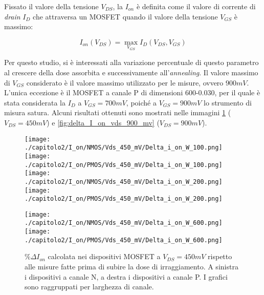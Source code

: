 Fissato il valore della tensione $V_{DS}$, la $I_{on}$ è definita come il valore di corrente di \emph{drain} $I_D$ che attraversa un MOSFET quando il valore della tensione $V_{GS}$ è massimo:

\begin{equation}
    I_{on}(V_{DS}) = \max_{V_{GS}} I_D(V_{DS},V_{GS})
\end{equation}

Per questo studio, si è interessati alla variazione percentuale di questo parametro al crescere della dose assorbita e successivamente all'\emph{annealing}. Il valore massimo di $V_{GS}$ considerato è il valore massimo utilizzato per le misure, ovvero $900 mV$. L'unica eccezione è il MOSFET a canale P di dimensioni 600-0.030, per il quale è stata considerata la $I_D$ a $V_{GS} = 700 mV$, poiché a $V_{GS} = 900mV$ lo strumento di misura satura. Alcuni risultati ottenuti sono mostrati nelle immagini \ref{fig:delta_I_on_vds_450_mv} ($V_{DS} = 450 mV$) e \ref{fig:delta_I_on_vds_900_mv} ($V_{DS} = 900 mV$).

\begin{figure}[h]
    \centering
    \texttt{[image: ./capitolo2/I\_on/NMOS/Vds\_450\_mV/Delta\_i\_on\_W\_100.png]}
    \texttt{[image: ./capitolo2/I\_on/PMOS/Vds\_450\_mV/Delta\_i\_on\_W\_100.png]}\\
    \vspace{0.2cm}
    \texttt{[image: ./capitolo2/I\_on/NMOS/Vds\_450\_mV/Delta\_i\_on\_W\_200.png]}
    \texttt{[image: ./capitolo2/I\_on/PMOS/Vds\_450\_mV/Delta\_i\_on\_W\_200.png]}\\
    \vspace{0.2cm}

    \texttt{[image: ./capitolo2/I\_on/NMOS/Vds\_450\_mV/Delta\_i\_on\_W\_600.png]}
    \texttt{[image: ./capitolo2/I\_on/PMOS/Vds\_450\_mV/Delta\_i\_on\_W\_600.png]}

    \caption[Dati $\% \Delta I_{on}$ a $V_{DS}=450mV$ ]{$\% \Delta I_{on}$ calcolata nei dispositivi MOSFET a $V_{DS} = 450mV$ rispetto alle misure fatte prima di subire la dose di irraggiamento. A sinistra i dispositivi a canale N, a destra i dispositivi a canale P. I grafici sono raggruppati per larghezza di canale.}
    \label{fig:delta_I_on_vds_450_mv}

\end{figure}

